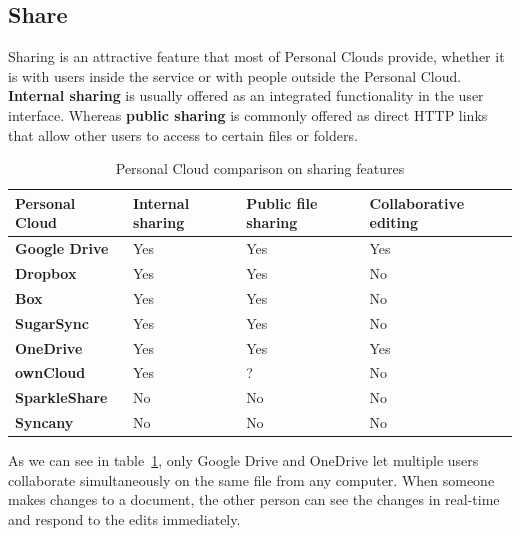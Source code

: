 \subsection{Share}


Sharing is an attractive feature that most of Personal Clouds provide, whether it is with users inside the service or with people outside the Personal Cloud. \textbf{Internal sharing} is usually offered as an integrated functionality in the user interface. Whereas \textbf{public sharing} is commonly offered as direct HTTP links that allow other users to access to certain files or folders.


{
\def\arraystretch{1.5}

\begin{table}
\begin{center}
    \begin{tabular}{ | p{3.3cm} | p{1.5cm} | p{2cm} | p{2.5cm} | }
    \hline
    \rowcolor[gray]{0.8}

	\textbf{Personal Cloud} &
	\textbf{Internal sharing} &
	\textbf{Public file sharing} &
	\textbf{Collaborative editing} \\ \hline

	\textbf{Google Drive} &
	Yes &
	Yes &
	Yes \\ \hline

	\textbf{Dropbox} &
	Yes &
	Yes &
	No \\ \hline
	
	\textbf{Box} &
	Yes &
	Yes &
	No \\ \hline
	
	\textbf{SugarSync} & 
	Yes &
	Yes &
	No \\ \hline
	
	\textbf{OneDrive} & 
	Yes &
	Yes &
	Yes \\ \hline
	
	\textbf{ownCloud} &
	Yes &
	? &
	No \\ \hline
	
	\textbf{SparkleShare} &
	No &
	No &
	No \\ \hline
	
	\textbf{Syncany} &
	No &
	No &
	No \\ \hline

    \end{tabular}
    \caption{Personal Cloud comparison on sharing features}
    \label{tab:pc_sharing}
\end{center}
\end{table}
}

As we can see in table~\ref{tab:pc_sharing}, only Google Drive and OneDrive let multiple users collaborate simultaneously on the same file from any computer. When someone makes changes to a document, the other person can see the changes in real-time and respond to the edits immediately.

